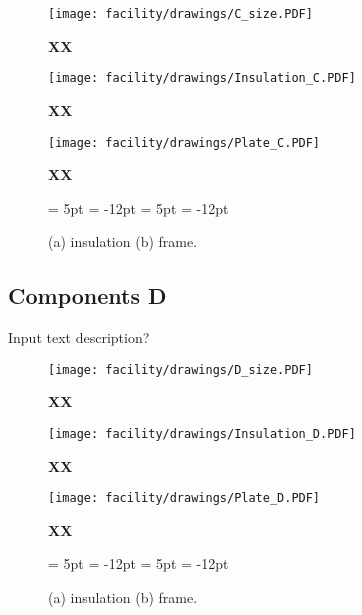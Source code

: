 \begin{figure}[h!]
\centering
\texttt{[image: facility/drawings/C\_size.PDF]}
\caption{\footnotesize {\bf XX} } 
\end{figure}

\begin{figure}[h!]
\centering
\texttt{[image: facility/drawings/Insulation\_C.PDF]}
\caption{\footnotesize {\bf XX} } 
\end{figure}

\begin{figure}[h!]
\centering
\texttt{[image: facility/drawings/Plate\_C.PDF]}
\caption{\footnotesize {\bf XX} } 
\end{figure}

\begin{figure}[h!]
  \begin{center}
  {\subfigcapskip = 5pt \subfigcapmargin = -12pt }
   {\subfigcapskip = 5pt \subfigcapmargin = -12pt  }
  \end{center}
\caption{(a) insulation (b) frame. } 
\end{figure}


\clearpage
\subsection{Components D}
Input text description?\\

\begin{figure}[h!]
\centering
\texttt{[image: facility/drawings/D\_size.PDF]}
\caption{\footnotesize {\bf XX} } 
\end{figure}

\begin{figure}[h!]
\centering
\texttt{[image: facility/drawings/Insulation\_D.PDF]}
\caption{\footnotesize {\bf XX} } 
\end{figure}

\begin{figure}[h!]
\centering
\texttt{[image: facility/drawings/Plate\_D.PDF]}
\caption{\footnotesize {\bf XX} } 
\end{figure}

\begin{figure}[h!]
  \begin{center}
  {\subfigcapskip = 5pt \subfigcapmargin = -12pt }
   {\subfigcapskip = 5pt \subfigcapmargin = -12pt  }
  \end{center}
\caption{(a) insulation (b) frame. } 
\end{figure}

